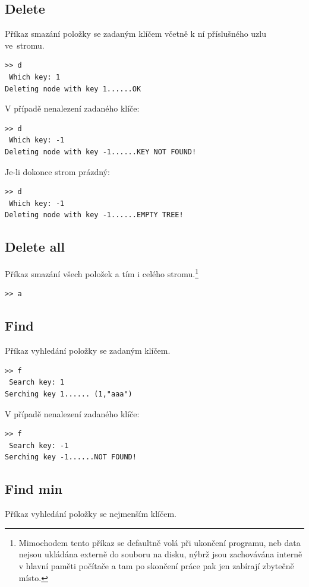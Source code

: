 \documentclass[11pt,a4paper]{article}
\begin{document}
\subsection{Delete}
Příkaz smazání položky se zadaným klíčem včetně k ní příslušného uzlu
ve~stromu.

\begin{verbatim}
>> d
 Which key: 1
Deleting node with key 1......OK
\end{verbatim}

V případě nenalezení zadaného klíče:

\begin{verbatim}
>> d
 Which key: -1
Deleting node with key -1......KEY NOT FOUND!
\end{verbatim}

Je-li dokonce strom prázdný:

\begin{verbatim}
>> d
 Which key: -1
Deleting node with key -1......EMPTY TREE!
\end{verbatim}

\subsection{Delete all}
Příkaz smazání všech položek a tím i celého stromu.\footnote{Mimochodem tento
příkaz se defaultně volá při ukončení programu, neb data nejsou ukládána
externě do souboru na disku, nýbrž jsou zachovávána interně v hlavní paměti
počítače a tam po skončení práce pak jen zabírají zbytečně místo.}

\begin{verbatim}
>> a
\end{verbatim}

\subsection{Find}
Příkaz vyhledání položky se zadaným klíčem.

\begin{verbatim}
>> f
 Search key: 1
Serching key 1...... (1,"aaa")
\end{verbatim}

V případě nenalezení zadaného klíče:

\begin{verbatim}
>> f
 Search key: -1
Serching key -1......NOT FOUND!
\end{verbatim}

\subsection{Find min}
Příkaz vyhledání položky se nejmenším klíčem.\footnotemark[4]
\end{document}
